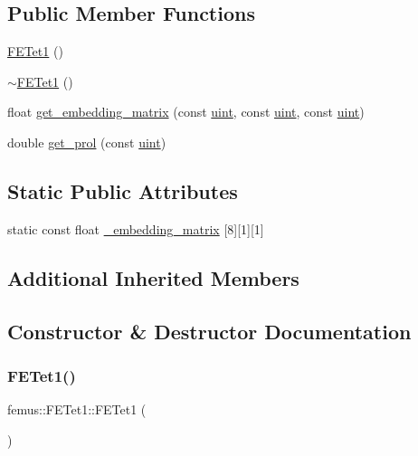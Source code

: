 \subsection*{Public Member Functions}
\begin{DoxyCompactItemize}
\item 
\mbox{\hyperlink{classfemus_1_1_f_e_tet1_ab85f1de91c8f64c54a210080af4ac489}{F\+E\+Tet1}} ()
\item 
\mbox{\hyperlink{classfemus_1_1_f_e_tet1_abde5b1fc0495f3d49ccdfe951ac2bc20}{$\sim$\+F\+E\+Tet1}} ()
\item 
float \mbox{\hyperlink{classfemus_1_1_f_e_tet1_a2963e6669725e8df2e98c30c1c82f91d}{get\+\_\+embedding\+\_\+matrix}} (const \mbox{\hyperlink{_typedefs_8hpp_a91ad9478d81a7aaf2593e8d9c3d06a14}{uint}}, const \mbox{\hyperlink{_typedefs_8hpp_a91ad9478d81a7aaf2593e8d9c3d06a14}{uint}}, const \mbox{\hyperlink{_typedefs_8hpp_a91ad9478d81a7aaf2593e8d9c3d06a14}{uint}})
\item 
double \mbox{\hyperlink{classfemus_1_1_f_e_tet1_aa0de96383fcaaaa22f35ea9a2780d660}{get\+\_\+prol}} (const \mbox{\hyperlink{_typedefs_8hpp_a91ad9478d81a7aaf2593e8d9c3d06a14}{uint}})
\end{DoxyCompactItemize}
\subsection*{Static Public Attributes}
\begin{DoxyCompactItemize}
\item 
static const float \mbox{\hyperlink{classfemus_1_1_f_e_tet1_a9c40788260ae985692adb8242830273a}{\+\_\+embedding\+\_\+matrix}} \mbox{[}8\mbox{]}\mbox{[}1\mbox{]}\mbox{[}1\mbox{]}
\end{DoxyCompactItemize}
\subsection*{Additional Inherited Members}


\subsection{Constructor \& Destructor Documentation}
\mbox{\label{classfemus_1_1_f_e_tet1_ab85f1de91c8f64c54a210080af4ac489}} 
\subsubsection{\texorpdfstring{F\+E\+Tet1()}{FETet1()}}
{\footnotesize\ttfamily femus\+::\+F\+E\+Tet1\+::\+F\+E\+Tet1 (\begin{DoxyParamCaption}{ }\end{DoxyParamCaption})}

